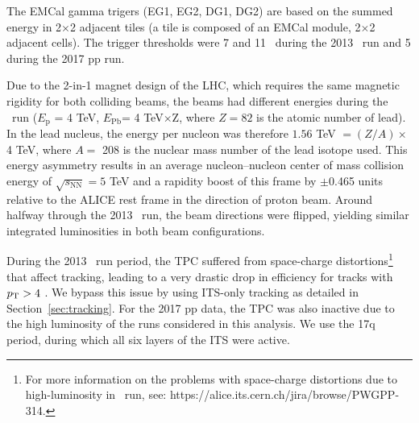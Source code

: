 The EMCal gamma trigers (EG1, EG2, DG1, DG2) are based on the summed energy in 2$\times$2 adjacent tiles (a tile is composed of an EMCal module, 2$\times$2 adjacent cells). The trigger thresholds were 7 and 11 \GeVc~during the 2013 \pPb~run and {5 \GeVc} during the 2017 pp run. %

Due to the 2-in-1 magnet design of the LHC, which requires the same magnetic rigidity for both colliding beams, the beams had different energies during the \pPb~run ({$E_{\mathrm{p}}$ = 4 TeV}, {$E_{\mathrm{Pb}} $= 4 TeV$\times$Z}, where $Z=82$ is the atomic number of lead). In the lead nucleus, the energy per nucleon was therefore  {$1.56$ TeV $= (Z/A) \times$ 4 TeV}, where $A =$ 208 is the nuclear
mass number of the lead isotope used. This energy asymmetry results in an average nucleon--nucleon center of mass collision energy of {$\sqrt{s_{\mathrm{NN}}}=5 $ TeV} and a rapidity boost of this frame by $\pm$0.465 units relative to the ALICE rest frame in the direction of proton beam. Around halfway through the 2013 \pPb~run, the beam directions were flipped, yielding similar integrated luminosities in both beam configurations. %

During the 2013 \pPb~run period, the TPC suffered from space-charge distortions\footnote{For more information on the problems with space-charge distortions due to high-luminosity in \pPb~run, see: https://alice.its.cern.ch/jira/browse/PWGPP-314.} that affect tracking, leading to a very drastic drop in efficiency for tracks with $p_{\mathrm{T}}> 4$ \GeVc. We bypass this issue by using ITS-only tracking as detailed in Section~\ref{sec:tracking}.
For the 2017 pp data, the TPC was also inactive due to the high luminosity of the runs considered in this analysis. We use the 17q period, during which all six layers of the ITS were active.

